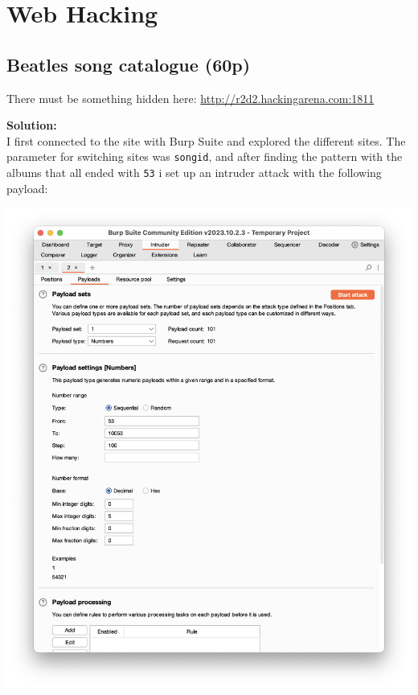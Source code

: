 \section{Web Hacking}

\subsection{Beatles song catalogue (60p)}
There must be something hidden here:
\url{http://r2d2.hackingarena.com:1811}

\textbf{Solution:}\\
I first connected to the site with Burp Suite and explored the different sites. The parameter for switching sites was \texttt{songid}, and after finding the pattern with the albums that all ended with \texttt{53} i set up an intruder attack with the following payload:

\begin{center}
    \includegraphics[width=14cm]{img/Web hacking/Beatles song catalogue/Skjermbilde 2023-10-26 kl. 13.06.47.png}
\end{center}

